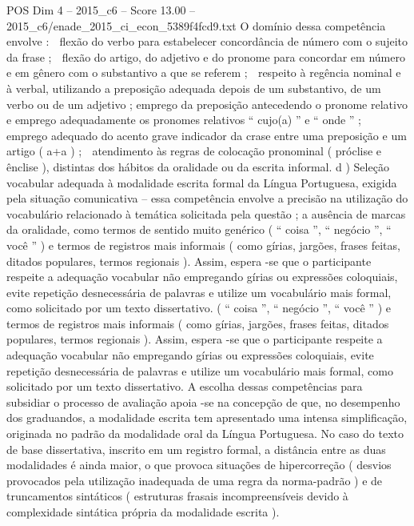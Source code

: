 \begin{textsample}{POS Dim 4 – 2015\_c6 – Score 13.00 – 2015\_c6/enade\_2015\_ci\_econ\_5389f4fcd9.txt}
O domínio dessa competência envolve :  flexão do verbo para estabelecer concordância de número com o sujeito da frase ;  flexão do artigo, do adjetivo e do pronome para concordar em número e em gênero com o substantivo a que se referem ;  respeito à regência nominal e à verbal, utilizando a preposição adequada depois de um substantivo, de um verbo ou de um adjetivo ; emprego da preposição antecedendo o pronome relativo e emprego adequadamente os pronomes relativos “ cujo(a) ” e “ onde ” ;  emprego adequado do acento grave indicador da crase entre uma preposição e um artigo ( a+a ) ;  atendimento às regras de colocação pronominal ( próclise e ênclise ), distintas dos hábitos da oralidade ou da escrita informal. d ) Seleção vocabular adequada à modalidade escrita formal da Língua Portuguesa, exigida pela situação comunicativa – essa competência envolve a precisão na utilização do vocabulário relacionado à temática solicitada pela questão ; a ausência de marcas da oralidade, como termos de sentido muito genérico ( “ coisa ”, “ negócio ”, “ você ” ) e termos de registros mais informais ( como gírias, jargões, frases feitas, ditados populares, termos regionais ).
Assim, espera -se que o participante respeite a adequação vocabular não empregando gírias ou expressões coloquiais, evite repetição desnecessária de palavras e utilize um vocabulário mais formal, como solicitado por um texto dissertativo. ( “ coisa ”, “ negócio ”, “ você ” ) e termos de registros mais informais ( como gírias, jargões, frases feitas, ditados populares, termos regionais ).
Assim, espera -se que o participante respeite a adequação vocabular não empregando gírias ou expressões coloquiais, evite repetição desnecessária de palavras e utilize um vocabulário mais formal, como solicitado por um texto dissertativo.
A escolha dessas competências para subsidiar o processo de avaliação apoia -se na concepção de que, no desempenho dos graduandos, a modalidade escrita tem apresentado uma intensa simplificação, originada no padrão da modalidade oral da Língua Portuguesa.
No caso do texto de base dissertativa, inscrito em um registro formal, a distância entre as duas modalidades é ainda maior, o que provoca situações de hipercorreção ( desvios provocados pela utilização inadequada de uma regra da norma-padrão ) e de truncamentos sintáticos ( estruturas frasais incompreensíveis devido à complexidade sintática própria da modalidade escrita ).

\end{textsample}
